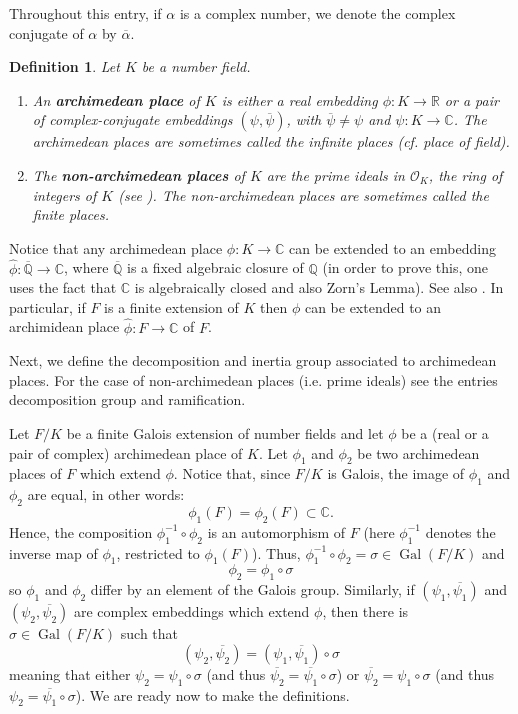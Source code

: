 \documentclass[12pt]{article}
\newtheorem{defn}{Definition}
\newcommand{\Reals}{\mathbb{R}}
\newcommand{\Complex}{\mathbb{C}}
\newcommand{\Rats}{\mathbb{Q}}
\newcommand{\Gal}{\operatorname{Gal}}
\begin{document}
Throughout this entry, if $\alpha$ is a complex number, we denote the complex conjugate of $\alpha$ by $\overline{\alpha}$.

\begin{defn}
Let $K$ be a number field.
\begin{enumerate}
\item An {\bf archimedean place} of $K$ is either a real embedding $\phi\colon K \to \Reals$ or a pair of complex-conjugate embeddings $(\psi,\overline{\psi})$, with $\overline{\psi}\neq \psi$ and $\psi\colon K\to \Complex$. The archimedean places are sometimes called the infinite places (cf. place of field).\\

\item The {\bf non-archimedean places} of $K$ are the prime ideals in $\mathcal{O}_K$, the ring of integers of $K$ (see ). The non-archimedean places are sometimes called the finite places.
\end{enumerate}
\end{defn}

Notice that any archimedean place $\phi\colon K\to \Complex$ can be extended to an embedding $\hat{\phi}\colon \overline{\Rats} \to \Complex$, where $\overline{\Rats}$ is a fixed algebraic closure of $\Rats$ (in order to prove this, one uses the fact that $\Complex$ is algebraically closed and also Zorn's Lemma). See also . In particular, if $F$ is a finite extension of $K$ then $\phi$ can be extended to an archimidean place $\hat{\phi}\colon F \to \Complex$ of $F$.

Next, we define the decomposition and inertia group associated to archimedean places. For the case of non-archimedean places (i.e. prime ideals) see the entries decomposition group and ramification.

Let $F/K$ be a finite Galois extension of number fields and let $\phi$ be a (real or a pair of complex) archimedean place of $K$. Let $\phi_1$ and $\phi_2$ be two archimedean places of $F$ which extend $\phi$. Notice that, since $F/K$ is Galois, the image of $\phi_1$ and $\phi_2$ are equal, in other words:
$$\phi_1(F)=\phi_2(F)\subset \Complex.$$
Hence, the composition $\phi_1^{-1}\circ \phi_2$ is an automorphism of $F$ (here $\phi_1^{-1}$ denotes the inverse map of $\phi_1$, restricted to $\phi_1(F)$). Thus, $\phi_1^{-1}\circ \phi_2 =\sigma \in \Gal(F/K)$ and
$$\phi_2 = \phi_1\circ \sigma$$
so $\phi_1$ and $\phi_2$ differ by an element of the Galois group. Similarly, if $(\psi_1,\overline{\psi_1})$ and $(\psi_2,\overline{\psi_2})$ are complex embeddings which extend $\phi$, then there is $\sigma\in\Gal(F/K)$ such that
$$(\psi_2,\overline{\psi_2})=(\psi_1,\overline{\psi_1})\circ \sigma$$
meaning that either $\psi_2 = \psi_1\circ \sigma$ (and thus $\overline{\psi_2} = \overline{\psi_1}\circ \sigma$) or $\overline{\psi_2} = \psi_1\circ \sigma$ (and thus $\psi_2 = \overline{\psi_1}\circ \sigma$). We are ready now to make the definitions.
\end{document}
